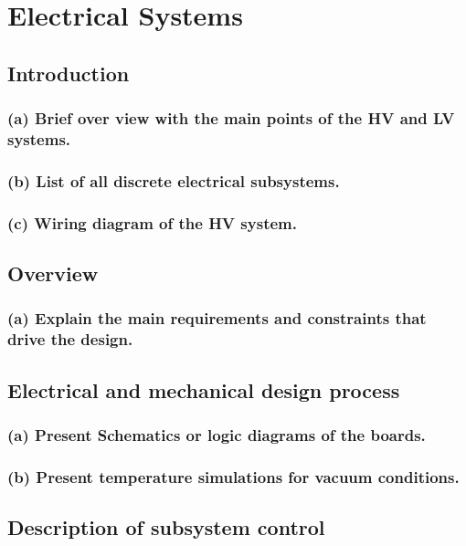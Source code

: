 
\chapter{Electrical Systems}
\section{Introduction}
\subsection{(a) Brief over view with the main points of the HV and LV systems.}
\subsection{(b) List of all discrete electrical subsystems.}
\subsection{(c) Wiring diagram of the HV system.}


\section{Overview}
\subsection{(a) Explain the main requirements and constraints that drive the design.}


\section{Electrical and mechanical design process}
\subsection{(a) Present Schematics or logic diagrams of the boards.}
\subsection{(b) Present temperature simulations for vacuum conditions.}


\section{Description of subsystem control}
